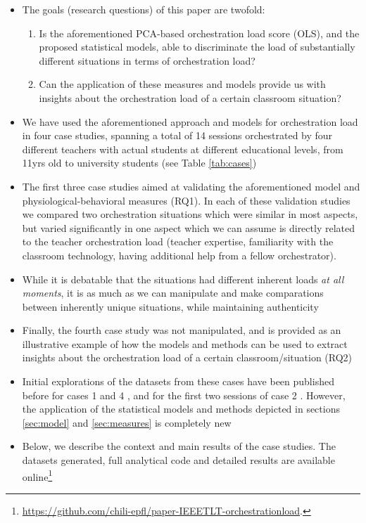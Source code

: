 \documentclass[10pt,journal,compsoc]{IEEEtran}
\begin{document}
\begin{itemize}
\item The goals (research questions) of this paper are twofold:
\begin{enumerate}
\item Is the aforementioned PCA-based orchestration load score (OLS), and the proposed statistical models, able to discriminate the load of  substantially different situations in terms of orchestration load?
\item Can the application of these measures and models provide us with insights about the orchestration load of a certain classroom situation?
\end{enumerate}
\item We have used the aforementioned approach and models for orchestration load in four case studies, spanning a total of 14 sessions
orchestrated by four different teachers with actual students at different educational levels, from 11yrs old to university students (see Table \ref{tab:cases})
\item The first three case studies aimed at validating the aforementioned model and physiological-behavioral measures (RQ1). In each of these validation studies we compared two orchestration situations which were similar in most aspects, but varied significantly in one aspect which we can assume is directly related to the teacher orchestration load (teacher expertise, familiarity with the classroom technology, having additional help from a fellow orchestrator). 
\item While it is debatable that the situations had different inherent loads \textit{at all moments}, it is as much as we can manipulate and make comparations between inherently unique situations, while maintaining authenticity
\item Finally, the fourth case study was not manipulated, and is provided as an illustrative example of how the models and methods can be used to extract insights about the orchestration load of a certain classroom/situation (RQ2)
\item Initial explorations of the datasets from these cases have been published before for cases 1 and 4 \cite{Prieto2015cscl}, and for the
first two sessions of case 2 \cite{Prieto2015ectel}. However, the application of the statistical models and methods depicted in sections \ref{sec:model} and \ref{sec:measures} is completely new
\item Below, we describe the context and main results of the case studies. The datasets generated, full analytical code and detailed results are available online\footnote{\href{https://github.com/chili-epfl/paper-IEEETLT-orchestrationload}{https://github.com/chili-epfl/paper-IEEETLT-orchestrationload}.}

\end{itemize}
\end{document}
